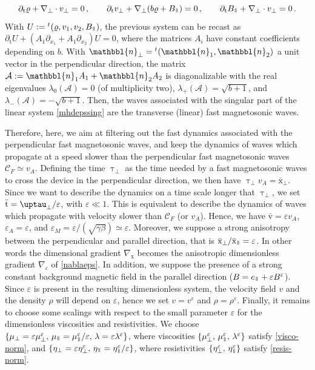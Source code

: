 \documentclass[11pt,reqno]{amsart}
\newcommand{\myparallel}{{\mkern3mu\vphantom{\perp}\vrule depth 0pt\mkern2mu\vrule depth 0pt\mkern3mu}}
\begin{document}
\[
\partial_{\text{t}} \varrho + \nabla_\perp \cdot v_\perp=0\,, \qquad
\partial_{\text{t}} v_\perp + \nabla_\perp (b\varrho + B_\myparallel)=0\,, \qquad
\partial_{\text{t}} B_\myparallel + \nabla_\perp \cdot v_\perp=0\,.
\]
With $U:={}^t(\varrho,v_1, v_2,  B_\myparallel)$, the previous system can be recast as $\partial_{\text{t}} U + (A_1\partial_{x_1}+A_1\partial_{x_2}) U=0$, where the  matrices $A_i$ have constant coefficients depending on $b$.
With $\mathbbl{n}_\perp={}^t(\mathbbl{n}_1,\mathbbl{n}_2)$ a unit vector in the perpendicular direction, the matrix $\mathcal{A}:=\mathbbl{n}_1 A_1+ \mathbbl{n}_2 A_2$ is diagonalizable with the real eigenvalues $\lambda_0(\mathcal{A})=0$ (of multiplicity two), $\lambda_+(\mathcal{A})=\sqrt{b+1}$, and $\lambda_-(\mathcal{A})=-\sqrt{b+1}$. Then, the waves associated with the singular part of the linear system \eqref{mhdepssing} are the transverse (linear) fast magnetosonic waves.

Therefore, here, we aim at filtering out the fast dynamics associated with the perpendicular fast magnetosonic waves, and keep the dynamics of waves which propagate at a speed slower than the perpendicular fast magnetosonic waves $ \mathcal C_F \simeq v_A$. Defining the time $\uptau_\perp$ as the time needed by a fast magnetosonic waves to cross the device in the perpendicular direction, we then have $\uptau_\perp v_A=\bar{\text{x}}_\perp$. Since we want to describe the dynamics on a time scale longer that $\uptau_\perp$, we set $\bar{\text t}=\uptau_\perp/\varepsilon$, with $\varepsilon \ll 1$. This is equivalent to describe the dynamics of waves which propagate with velocity slower than $ \mathcal C_F$ (or $v_A$). Hence, we have $\bar{\text{v}}=\varepsilon v_A$, $\varepsilon_A=\varepsilon$,  and $\varepsilon_M=\varepsilon/(\sqrt{\gamma \beta})\simeq \varepsilon$. Moreover, we suppose a strong anisotropy between the perpendicular and parallel direction, that is $\bar{\text{x}}_\perp/\bar{\text{x}}_\myparallel=\varepsilon$. In other words the dimensional gradient $\nabla_{\text{x}}$ becomes the anisotropic dimensionless gradient $\nabla_\varepsilon$ of  \eqref{nablaeps}. In addition, we suppose the presence of a strong constant background magnetic field in the parallel direction ($B=e_\myparallel +\varepsilon B^\varepsilon$). Since $\varepsilon$ is present in the resulting dimensionless system, the  velocity field $v$ and the density $\rho$ will depend on $\varepsilon$, hence we set $v=v^\varepsilon$ and $\rho=\rho^\varepsilon$. Finally, it remains to choose some scalings with respect to the small parameter $\varepsilon$ for the dimensionless viscosities and resistivities. We choose $\{\mu_\perp=\varepsilon \mu_\perp^\varepsilon,\,  \mu_\myparallel= \mu_\myparallel^\varepsilon/\varepsilon,\, \lambda=\varepsilon\lambda^\varepsilon\}$, where viscosities $\{\mu_\perp^\varepsilon,\, \mu_\myparallel^\varepsilon,\, \lambda^\varepsilon\}$ satisfy \eqref{visco-norm}, and $\{\eta_\perp=\varepsilon \eta_\perp^\varepsilon,\,  \eta_\myparallel= \eta_\myparallel^\varepsilon/\varepsilon\}$, where resistivities $\{\eta_\perp^\varepsilon,\, \eta_\myparallel^\varepsilon\}$ satisfy \eqref{resis-norm}.
\end{document}
